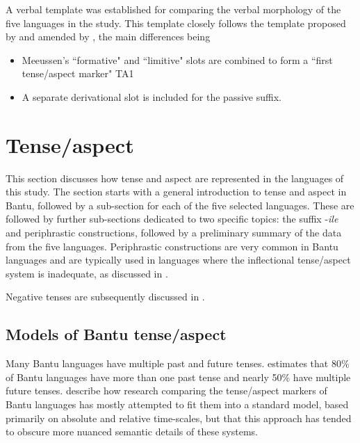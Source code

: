 \documentclass[output=paper,
            colorlinks, citecolor=brown
            ,draftmode
		  ]{langscibook}
\begin{document}
A verbal template was established for comparing the verbal morphology of the five languages in the study. This template closely follows the template proposed by \citet{Meeussen1967} and amended by \citet{Nurse2008}, the main differences being


\begin{itemize}
\item 
Meeussen's “formative" and “limitive" slots are combined to form a “first tense/aspect marker" TA1

\item 
A separate derivational slot is included for the passive suffix.

\end{itemize}


\section{Tense/aspect}\label{sec:petzell:3}

This section discusses how tense and aspect are represented in the languages of this study. The section starts with a general introduction to tense and aspect in Bantu, followed by a sub-section for each of the five selected languages. These are followed by further sub-sections dedicated to two specific topics: the suffix \nobreakdash-\textit{ile} and periphrastic constructions, followed by a preliminary summary of the data from the five languages. Periphrastic constructions are very common in Bantu languages and are typically used in languages where the inflectional tense/aspect system is inadequate, as discussed in .



Negative tenses are subsequently discussed in  .


\subsection{Models of Bantu tense/aspect}\label{sec:petzell:3.1}

Many Bantu languages have multiple past and future tenses. \citet[103]{Nurse2008} estimates that 80\% of Bantu languages have more than one past tense and nearly 50\% have multiple future tenses. \citet[147]{BotneKershner2008} describe how research comparing the tense/aspect markers of Bantu languages has mostly attempted to fit them into a standard model, based primarily on absolute and relative time-scales, but that this approach has tended to obscure more nuanced semantic details of these systems.
\end{document}
